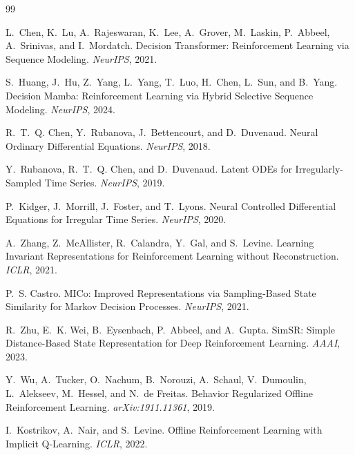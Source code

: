 \documentclass[11pt]{article}
\begin{document}
\begin{thebibliography}{99}

L.~Chen, K.~Lu, A.~Rajeswaran, K.~Lee, A.~Grover, M.~Laskin, P.~Abbeel,
A.~Srinivas, and I.~Mordatch.
Decision Transformer: Reinforcement Learning via Sequence Modeling.
\textit{NeurIPS}, 2021.

S.~Huang, J.~Hu, Z.~Yang, L.~Yang, T.~Luo, H.~Chen, L.~Sun, and B.~Yang.
Decision Mamba: Reinforcement Learning via Hybrid Selective Sequence Modeling.
\textit{NeurIPS}, 2024.

R.~T.~Q. Chen, Y.~Rubanova, J.~Bettencourt, and D.~Duvenaud.
Neural Ordinary Differential Equations.
\textit{NeurIPS}, 2018.

Y.~Rubanova, R.~T.~Q. Chen, and D.~Duvenaud.
Latent ODEs for Irregularly-Sampled Time Series.
\textit{NeurIPS}, 2019.

P.~Kidger, J.~Morrill, J.~Foster, and T.~Lyons.
Neural Controlled Differential Equations for Irregular Time Series.
\textit{NeurIPS}, 2020.

A.~Zhang, Z.~McAllister, R.~Calandra, Y.~Gal, and S.~Levine.
Learning Invariant Representations for Reinforcement Learning without Reconstruction.
\textit{ICLR}, 2021.

P.~S. Castro.
MICo: Improved Representations via Sampling-Based State Similarity for Markov Decision Processes.
\textit{NeurIPS}, 2021.

R.~Zhu, E.~K. Wei, B.~Eysenbach, P.~Abbeel, and A.~Gupta.
SimSR: Simple Distance-Based State Representation for Deep Reinforcement Learning.
\textit{AAAI}, 2023.

Y.~Wu, A.~Tucker, O.~Nachum, B.~Norouzi, A.~Schaul, V.~Dumoulin,
L.~Alekseev, M.~Hessel, and N.~de Freitas.
Behavior Regularized Offline Reinforcement Learning.
\textit{arXiv:1911.11361}, 2019.

I.~Kostrikov, A.~Nair, and S.~Levine.
Offline Reinforcement Learning with Implicit Q-Learning.
\textit{ICLR}, 2022.

\end{thebibliography}
\end{document}
